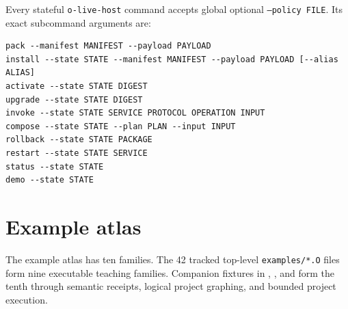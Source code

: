 \documentclass[11pt,oneside]{article}
\begin{document}
Every stateful \texttt{o-live-host} command accepts global optional
\texttt{--policy FILE}. Its exact subcommand arguments are:

\begin{lstlisting}[style=plaincode]
pack --manifest MANIFEST --payload PAYLOAD
install --state STATE --manifest MANIFEST --payload PAYLOAD [--alias ALIAS]
activate --state STATE DIGEST
upgrade --state STATE DIGEST
invoke --state STATE SERVICE PROTOCOL OPERATION INPUT
compose --state STATE --plan PLAN --input INPUT
rollback --state STATE PACKAGE
restart --state STATE SERVICE
status --state STATE
demo --state STATE
\end{lstlisting}

\section{Example atlas}

The example atlas has ten families. The 42 tracked top-level
\texttt{examples/*.O} files form nine executable teaching families. Companion
fixtures in ,
, and
 form the tenth through semantic
receipts, logical project graphing, and bounded project execution.
\end{document}
